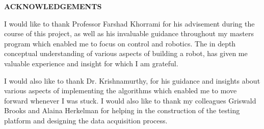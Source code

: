 \clearpage
\vspace*{\fill}
	\begin{center}
		\begin{minipage}{\textwidth}
			{\begin{center}{\textbf{ACKNOWLEDGEMENTS}}\end{center}\vspace{10mm}}

				I would like to thank Professor Farshad Khorrami for his advisement during the course of this project, as well as his invaluable guidance throughout my masters program which enabled me to focus on control and robotics. The in depth conceptual understanding of various aspects of building a robot, has given me valuable experience and insight for which I am grateful. 
				
				\vspace{5mm}
				\hspace{5mm} 
				I would also like to thank Dr. Krishnamurthy, for his guidance and insights about various aspects of implementing the algorithms which enabled me to move forward whenever I was stuck. I would also like to thank my colleagues Griswald Brooks and Alaina Herkelman for helping in the construction of the testing platform and designing the data acquisition process. 

		\end{minipage}
	\end{center}
\vfill %
\clearpage
